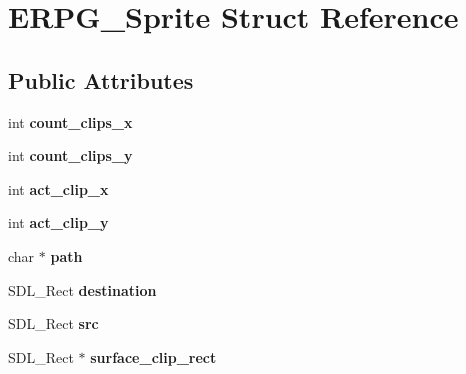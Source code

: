 \hypertarget{structERPG__Sprite}{\section{E\-R\-P\-G\-\_\-\-Sprite Struct Reference}
\label{structERPG__Sprite}
}
\subsection*{Public Attributes}
\begin{DoxyCompactItemize}
\item 
\hypertarget{structERPG__Sprite_ac4a1c4c89526d8b3f4e31fc700438797}{int {\bfseries count\-\_\-clips\-\_\-x}}\label{structERPG__Sprite_ac4a1c4c89526d8b3f4e31fc700438797}

\item 
\hypertarget{structERPG__Sprite_a085fce00c9210092fbd406202da048b1}{int {\bfseries count\-\_\-clips\-\_\-y}}\label{structERPG__Sprite_a085fce00c9210092fbd406202da048b1}

\item 
\hypertarget{structERPG__Sprite_a926a5be3690148111f6799a4d12c28e1}{int {\bfseries act\-\_\-clip\-\_\-x}}\label{structERPG__Sprite_a926a5be3690148111f6799a4d12c28e1}

\item 
\hypertarget{structERPG__Sprite_a47eebf85b1374cbda93373fc7fe93f4a}{int {\bfseries act\-\_\-clip\-\_\-y}}\label{structERPG__Sprite_a47eebf85b1374cbda93373fc7fe93f4a}

\item 
\hypertarget{structERPG__Sprite_a267af6a03c7b33c21a07919976a673ef}{char $\ast$ {\bfseries path}}\label{structERPG__Sprite_a267af6a03c7b33c21a07919976a673ef}

\item 
\hypertarget{structERPG__Sprite_ac6a08ce55a96fb54dbdb7803961adb62}{S\-D\-L\-\_\-\-Rect {\bfseries destination}}\label{structERPG__Sprite_ac6a08ce55a96fb54dbdb7803961adb62}

\item 
\hypertarget{structERPG__Sprite_a81b9ebe2818edeaabce3ee5959d18ab5}{S\-D\-L\-\_\-\-Rect {\bfseries src}}\label{structERPG__Sprite_a81b9ebe2818edeaabce3ee5959d18ab5}

\item 
\hypertarget{structERPG__Sprite_aecfdbec2f6526b34c5712cfd5fdec69f}{S\-D\-L\-\_\-\-Rect $\ast$ {\bfseries surface\-\_\-clip\-\_\-rect}}\label{structERPG__Sprite_aecfdbec2f6526b34c5712cfd5fdec69f}


\end{DoxyCompactItemize}
